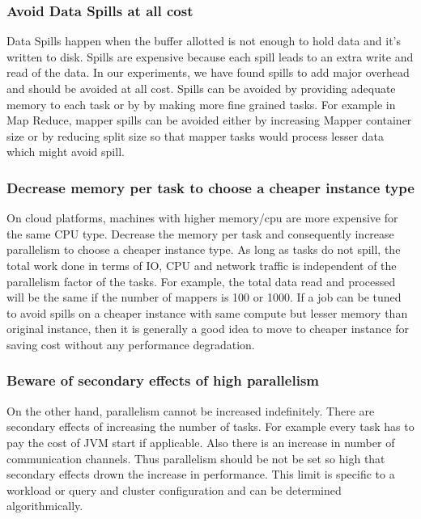 {\noindent\subsubsection*{\bf Avoid Data Spills at all cost}
Data Spills happen when the buffer allotted is not enough to hold data and it's written to disk. Spills are expensive because each spill leads to an extra write and read of the data. In our experiments, we have found spills to add major overhead and should be avoided at all cost. Spills can be avoided by providing adequate memory to each task or by by making more fine grained tasks.
For example in Map Reduce, mapper spills can be avoided either by increasing Mapper container size or by reducing split size so that mapper tasks would process lesser data which might avoid spill.

\noindent\subsubsection*{\bf Decrease memory per task to choose a cheaper instance type}
On cloud platforms, machines with higher memory/cpu are more expensive for the same CPU type. Decrease the memory per task and consequently increase parallelism to choose a cheaper instance type. As long as tasks do not spill, the total work done in terms of IO, CPU and network traffic is independent of the parallelism factor of the tasks. For example, the total data read and processed will be the same if the number of mappers is 100 or 1000.  If a job can be tuned to avoid spills on a cheaper instance with same compute but lesser memory than original instance, then it is generally a good idea to move to cheaper instance for saving cost without any performance degradation. 

\noindent\subsubsection*{\bf Beware of secondary effects of high parallelism}
On the other hand, parallelism cannot be increased indefinitely. There are secondary effects of increasing the number of tasks. For example every task has to pay the cost of JVM start if applicable. Also there is an increase in number of communication channels. Thus parallelism should be not be set so high that secondary effects drown the increase in performance. This limit is specific to a workload or query and cluster configuration and can be determined algorithmically. 

}
